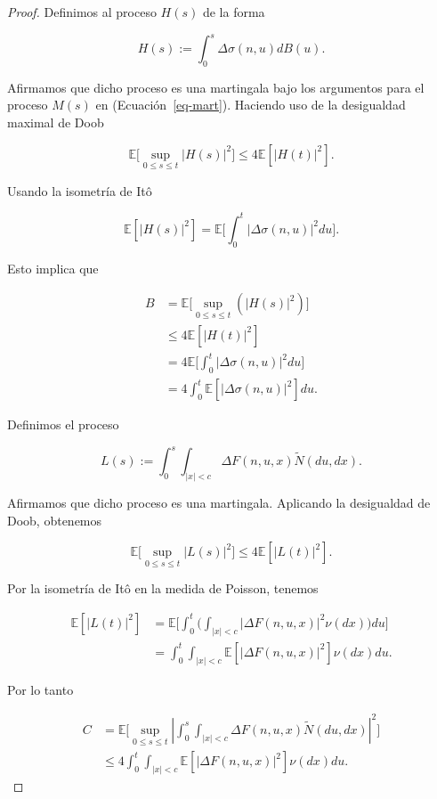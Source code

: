 \documentclass[
  spanish,
  us-letterpaper,
]{scrreprt}
\theoremstyle{plain}
\theoremstyle{plain}
\theoremstyle{plain}
\theoremstyle{definition}
\theoremstyle{remark}
\begin{document}
\begin{proof}
Definimos al proceso \(H(s)\) de la forma

\[
    H(s) := \int_0^s \Delta \sigma(n,u)dB(u).
\]

Afirmamos que dicho proceso es una martingala bajo los argumentos para
el proceso \(M(s)\) en (Ecuación~\ref{eq-mart}). Haciendo uso de la
desigualdad maximal de Doob

\[
    \mathbb{E}\Bigg[\sup\limits_{0\leq s\leq t}|H(s)|^2\Bigg]\leq 4\mathbb{E}[|H(t)|^2].
\]

Usando la isometría de Itô

\[
    \mathbb{E}[|H(s)|^2]=\mathbb{E}\Bigg[\int_0^t |\Delta \sigma(n,u)|^2 du\Bigg].
\]

Esto implica que

\[
    \begin{aligned}
        B & = \mathbb{E}\Bigg[\sup\limits_{0\leq s\leq t}\left(|H(s)|^2\right)\Bigg]\\ 
        & \leq 4\mathbb{E}[|H(t)|^2]\\ 
        & = 4 \mathbb{E}\Bigg[\int_0^t |\Delta \sigma(n,u)|^2du\Bigg]\\ 
        & = 4 \int_0^t \mathbb{E}[|\Delta \sigma(n,u)|^2]du.
    \end{aligned}
\]

Definimos el proceso

\[
    L(s) := \int_0^s\int_{|x|<c} \Delta F(n,u,x)\widetilde{N}(du,dx).
\]

Afirmamos que dicho proceso es una martingala. Aplicando la desigualdad
de Doob, obtenemos

\[
    \mathbb{E}\Bigg[\sup\limits_{0\leq s\leq t} |L(s)|^2\Bigg]\leq 4\mathbb{E}\left[|L(t)|^2\right].
\]

Por la isometría de Itô en la medida de Poisson, tenemos

\[
    \begin{aligned}
        \mathbb{E}\left[|L(t)|^2\right] & = \mathbb{E}\Bigg[\int_0^t\Bigg(\int_{|x|<c}|\Delta F(n,u,x)|^2\nu(dx)\Bigg)du\Bigg]\\ 
        & = \int_0^t\int_{|x|<c}\mathbb{E}\left[|\Delta F(n,u,x)|^2\right]\nu(dx)du.
    \end{aligned}
\]

Por lo tanto

\[
    \begin{aligned}
        C & = \mathbb{E}\Bigg[\sup\limits_{0\leq s\leq t}\left|\int_0^s\int_{|x|<c}\Delta F(n,u,x)\widetilde{N}(du,dx)\right|^2\Bigg]\\ 
        & \leq 4 \int_0^t\int_{|x|<c}\mathbb{E}\left[|\Delta F(n,u,x)|^2\right]\nu(dx)du.
    \end{aligned}
\]


\end{proof}
\end{document}
